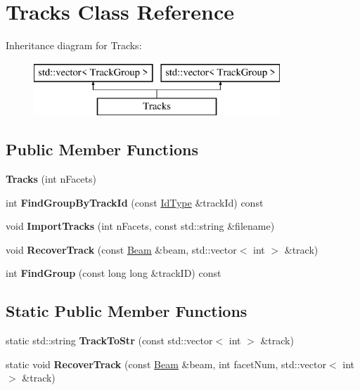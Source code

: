 \hypertarget{class_tracks}{}\section{Tracks Class Reference}
\label{class_tracks}
Inheritance diagram for Tracks\+:\begin{figure}[H]
\begin{center}
\leavevmode
\includegraphics[height=2.000000cm]{class_tracks}
\end{center}
\end{figure}
\subsection*{Public Member Functions}
\begin{DoxyCompactItemize}
\item 
\mbox{\label{class_tracks_a1b25ede933c3cae43d01cdf5d16eae54}} 
{\bfseries Tracks} (int n\+Facets)
\item 
\mbox{\label{class_tracks_aeee2af5000d0c418f51a33f96d1e93f7}} 
int {\bfseries Find\+Group\+By\+Track\+Id} (const \mbox{\hyperlink{class_big_integer}{Id\+Type}} \&track\+Id) const
\item 
\mbox{\label{class_tracks_a7a61b8c7b50c6132a06b9883bf779f1b}} 
void {\bfseries Import\+Tracks} (int n\+Facets, const std\+::string \&filename)
\item 
\mbox{\label{class_tracks_aed07786d2b9af54a341ca8322d39d91c}} 
void {\bfseries Recover\+Track} (const \mbox{\hyperlink{class_beam}{Beam}} \&beam, std\+::vector$<$ int $>$ \&track)
\item 
\mbox{\label{class_tracks_a71e296927bcac5f60bff87c37c71e1db}} 
int {\bfseries Find\+Group} (const long long \&track\+ID) const
\end{DoxyCompactItemize}
\subsection*{Static Public Member Functions}
\begin{DoxyCompactItemize}
\item 
\mbox{\label{class_tracks_aaf66ef556b4523971ccebe04a28d7f7b}} 
static std\+::string {\bfseries Track\+To\+Str} (const std\+::vector$<$ int $>$ \&track)
\item 
\mbox{\label{class_tracks_a122cf0fd15ee1c23e58a01d483974985}} 
static void {\bfseries Recover\+Track} (const \mbox{\hyperlink{class_beam}{Beam}} \&beam, int facet\+Num, std\+::vector$<$ int $>$ \&track)
\end{DoxyCompactItemize}
